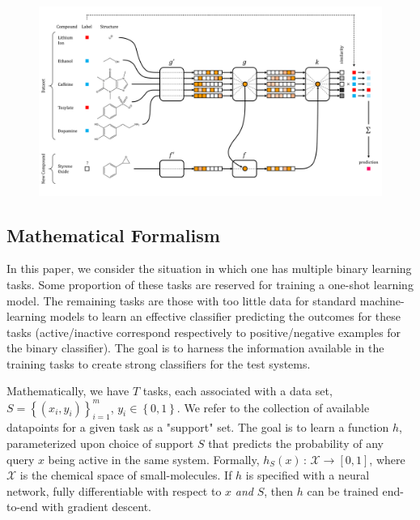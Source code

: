 \documentclass[journal=jacsat,manuscript=article]{achemso}
\providecommand{\DIFaddend}{} %
\begin{document}
\begin{figure}[h]
\includegraphics[width=\textwidth]{schematic.png}
\label{fig:schematic}
\end{figure}
\DIFaddend 

\subsection{Mathematical Formalism}

In this paper, we consider the situation in which one has multiple binary learning tasks. Some proportion of these tasks are reserved for training a one-shot learning model. The remaining tasks are those with too little data for standard machine-learning models to learn an effective classifier predicting the outcomes for these tasks (active/inactive correspond respectively to positive/negative examples for the binary classifier). The goal is to harness the information available in the training tasks to create strong classifiers for the test systems. 


Mathematically, we have $T$ tasks, each associated with a data set, $S=\left\{\left(x_i,y_i\right)\right\}_{i=1}^{m}$, $y_i\in\left\{0,1\right\}$. We refer to the collection of available datapoints for a given task as a "support" set. The goal is to learn a function $h$, parameterized upon choice of support $S$ that predicts the probability of any query $x$ being active in the same system. Formally, $h_S(x)\,:\,\mathcal{X}\rightarrow\left[0,1\right]$, where $\mathcal{X}$ is the chemical space of small-molecules. If $h$ is specified with a neural network, fully differentiable with respect to $x$ \emph{and} $S$, then $h$ can be trained end-to-end with gradient descent.
\end{document}
